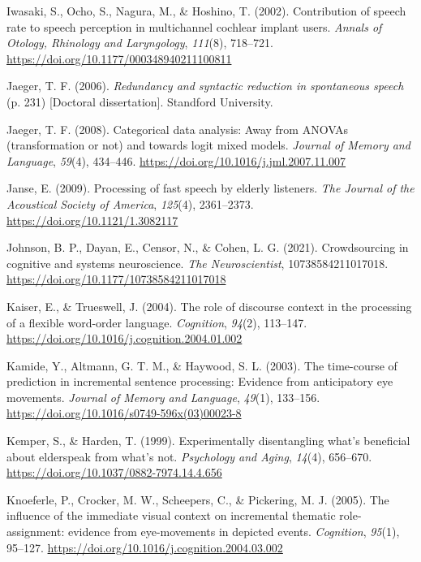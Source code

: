 \documentclass[a4paper, nobind]{templates/ociamthesis}
\newlength{\cslhangindent}
\newenvironment{CSLReferences}[2] %
 {%
  \setlength{\parindent}{0pt}
  \ifodd #1
  \let\oldpar\par
  \def\par{\hangindent=\cslhangindent\oldpar}
  \fi
  \setlength{\parskip}{1mm}
  \setlength{\baselineskip}{6mm}
 }%
 {}
\begin{document}
\begin{CSLReferences}{1}{0}
\leavevmode{}%
Iwasaki, S., Ocho, S., Nagura, M., \& Hoshino, T. (2002). {Contribution of speech rate to speech perception in multichannel cochlear implant users}. \emph{Annals of Otology, Rhinology and Laryngology}, \emph{111}(8), 718--721. \url{https://doi.org/10.1177/000348940211100811}

\leavevmode{}%
Jaeger, T. F. (2006). \emph{{Redundancy and syntactic reduction in spontaneous speech}} (p. 231) {[}Doctoral dissertation{]}. Standford University.

\leavevmode{}%
Jaeger, T. F. (2008). {Categorical data analysis: Away from ANOVAs (transformation or not) and towards logit mixed models}. \emph{Journal of Memory and Language}, \emph{59}(4), 434--446. \url{https://doi.org/10.1016/j.jml.2007.11.007}

\leavevmode{}%
Janse, E. (2009). {Processing of fast speech by elderly listeners}. \emph{The Journal of the Acoustical Society of America}, \emph{125}(4), 2361--2373. \url{https://doi.org/10.1121/1.3082117}

\leavevmode{}%
Johnson, B. P., Dayan, E., Censor, N., \& Cohen, L. G. (2021). {Crowdsourcing in cognitive and systems neuroscience}. \emph{The Neuroscientist}, 10738584211017018. \url{https://doi.org/10.1177/10738584211017018}

\leavevmode{}%
Kaiser, E., \& Trueswell, J. (2004). The role of discourse context in the processing of a flexible word-order language. \emph{Cognition}, \emph{94}(2), 113--147. \url{https://doi.org/10.1016/j.cognition.2004.01.002}

\leavevmode{}%
Kamide, Y., Altmann, G. T. M., \& Haywood, S. L. (2003). The time-course of prediction in incremental sentence processing: Evidence from anticipatory eye movements. \emph{Journal of Memory and Language}, \emph{49}(1), 133--156. \url{https://doi.org/10.1016/s0749-596x(03)00023-8}

\leavevmode{}%
Kemper, S., \& Harden, T. (1999). {Experimentally disentangling what's beneficial about elderspeak from what's not}. \emph{Psychology and Aging}, \emph{14}(4), 656--670. \url{https://doi.org/10.1037/0882-7974.14.4.656}

\leavevmode{}%
Knoeferle, P., Crocker, M. W., Scheepers, C., \& Pickering, M. J. (2005). The influence of the immediate visual context on incremental thematic role-assignment: evidence from eye-movements in depicted events. \emph{Cognition}, \emph{95}(1), 95--127. \url{https://doi.org/10.1016/j.cognition.2004.03.002}


\end{CSLReferences}
\end{document}
